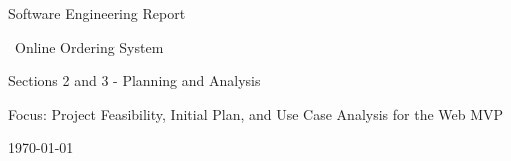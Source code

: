 



\begin{titlepage}
    \centering
    {\Large Software Engineering Report\par}
    \vspace{1.2cm}
    {\huge \systemname\ Online Ordering System\par}
    \vspace{0.6cm}
    {\Large Sections 2 and 3 - Planning and Analysis\par}
    \vspace{1.2cm}
    {\large Focus: Project Feasibility, Initial Plan, and Use Case Analysis for the Web MVP\par}
    \vfill
    {\large \today\par}
\end{titlepage}

\clearpage
{}
\tableofcontents
\newpage


\newpage



